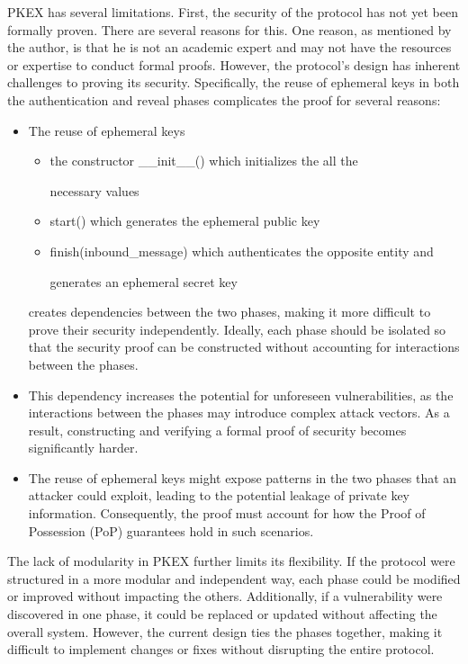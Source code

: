 PKEX has several limitations. First, the security of the protocol has not yet
been formally proven. There are several reasons for this. One reason, as
mentioned by the author, is that he is not an academic expert and may not have
the resources or expertise to conduct formal proofs. However, the protocol's
design has inherent challenges to proving its security. Specifically, the reuse
of ephemeral keys in both the authentication and reveal phases complicates the
proof for several reasons:

\begin{itemize} 
	\item The reuse of ephemeral keys \begin{itemize}

	\item the constructor \_\_init\_\_() which initializes the all the

		necessary values 

	\item start() which generates the ephemeral public key

	\item finish(inbound\_message) which authenticates the opposite entity and

		generates an ephemeral secret key

\end{itemize}creates dependencies between the two
		phases, making it more difficult to prove their security independently.
		Ideally, each phase should be isolated so that the security proof can
		be constructed without accounting for interactions between the phases.
	\item This dependency increases the potential for unforeseen
		vulnerabilities, as the interactions between the phases may introduce
		complex attack vectors. As a result, constructing and verifying a
		formal proof of security becomes significantly harder. 
	\item The reuse of ephemeral keys might expose patterns in the two phases
		that an attacker could exploit, leading to the potential leakage of
		private key information. Consequently, the proof must account for how
		the Proof of Possession (PoP) guarantees hold in such scenarios.
\end{itemize}

The lack of modularity in PKEX further limits its flexibility. If the protocol
were structured in a more modular and independent way, each phase could be
modified or improved without impacting the others. Additionally, if a
vulnerability were discovered in one phase, it could be replaced or updated
without affecting the overall system. However, the current design ties the
phases together, making it difficult to implement changes or fixes without
disrupting the entire protocol.
